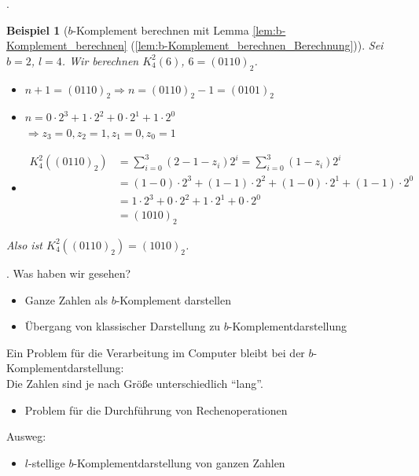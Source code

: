 \documentclass{beamer}
\newtheorem{beispiel}[satz]{Beispiel}
\newcommand{\secframe}{\begin{frame}{\insertsectionnumber. \insertsection}}
\newcommand{\subsecframe}{\begin{frame}{\insertsectionnumber.\insertsubsectionnumber \ \insertsubsection}}
\begin{document}
        \subsecframe
            \begin{beispiel}[$b$-Komplement berechnen mit Lemma \ref{lem:b-Komplement_berechnen} (\ref{lem:b-Komplement_berechnen_Berechnung})]
                Sei $b=2$, $l=4$. Wir berechnen $K_4^2(6)$, $6 = (0110)_2$.\\
                \begin{itemize}
                    \item $n+1 = (0110)_2 \Rightarrow n = (0110)_2 -1 = (0101)_2$
                    \item $n=0 \cdot 2^3 + 1 \cdot 2^2 + 0\cdot 2^1 + 1\cdot 2^0$ \\
                        $\Rightarrow z_3 = 0, z_2 = 1, z_1 = 0, z_0 =1$
                    \item   \begin{align*}
                                K_4^2((0110)_2) &= \sum_{i=0}^3(2-1-z_i)2^i = \sum_{i=0}^3(1-z_i)2^i \\
                                &= (1-0) \cdot 2^3 + (1-1) \cdot 2^2 + (1-0) \cdot 2^1 + (1-1) \cdot 2^0 \\
                                &= 1 \cdot 2^3 + 0 \cdot 2^2 + 1\cdot 2^1 + 0\cdot 2^0 \\
                                &= (1010)_2
                            \end{align*}
                \end{itemize}
                Also ist $K_4^2((0110)_2) = (1010)_2$.
            \end{beispiel}
        \end{frame}

    \secframe
        Was haben wir gesehen?
        \begin{itemize}
            \item Ganze Zahlen als $b$-Komplement darstellen
            \item Übergang von klassischer Darstellung zu $b$-Komplementdarstellung
        \end{itemize}
        \vspace{\baselineskip}
        Ein Problem für die Verarbeitung im Computer bleibt bei der $b$-Komplementdarstellung: \\
        Die Zahlen sind je nach Größe unterschiedlich ``lang''.
        \begin{itemize}
            \item Problem für die Durchführung von Rechenoperationen
        \end{itemize}
        Ausweg:
        \begin{itemize}
            \item $l$-stellige $b$-Komplementdarstellung von ganzen Zahlen
        \end{itemize}
    \end{frame}
\end{document}
